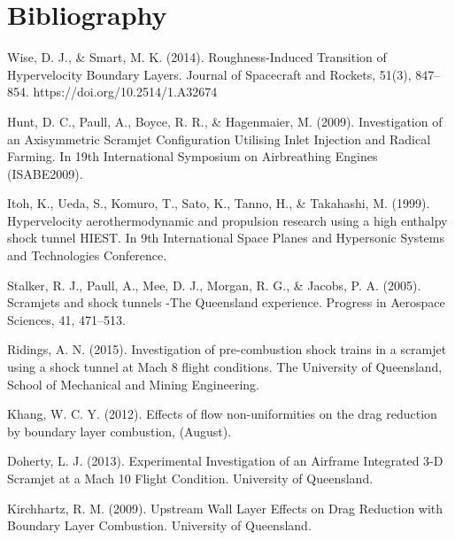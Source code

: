 \documentclass{AIAA}
\begin{document}
\section{Bibliography}

\begin{thebibliography}{}


Wise, D. J., \& Smart, M. K. (2014). Roughness-Induced Transition of Hypervelocity Boundary Layers. Journal of Spacecraft and Rockets, 51(3), 847–854. https://doi.org/10.2514/1.A32674


Hunt, D. C., Paull, A., Boyce, R. R., \& Hagenmaier, M. (2009). Investigation of an Axisymmetric Scramjet Configuration Utilising Inlet Injection and Radical Farming. In 19th International Symposium on Airbreathing Engines (ISABE2009).


Itoh, K., Ueda, S., Komuro, T., Sato, K., Tanno, H., \& Takahashi, M. (1999). Hypervelocity aerothermodynamic and propulsion research using a high enthalpy shock tunnel HIEST. In 9th International Space Planes and Hypersonic Systems and Technologies Conference.


Stalker, R. J., Paull, A., Mee, D. J., Morgan, R. G., \& Jacobs, P. A. (2005). Scramjets and shock tunnels -The Queensland experience. Progress in Aerospace Sciences, 41, 471–513.


Ridings, A. N. (2015). Investigation of pre-combustion shock trains in a scramjet using a shock tunnel at Mach 8 flight conditions. The University of Queensland, School of Mechanical and Mining Engineering.


Khang, W. C. Y. (2012). Effects of flow non-uniformities on the drag reduction by boundary layer combustion, (August).


Doherty, L. J. (2013). Experimental Investigation of an Airframe Integrated 3-D Scramjet at a Mach 10 Flight Condition. University of Queensland.


Kirchhartz, R. M. (2009). Upstream Wall Layer Effects on Drag Reduction with Boundary Layer Combustion. University of Queensland.



\end{thebibliography}
\end{document}
